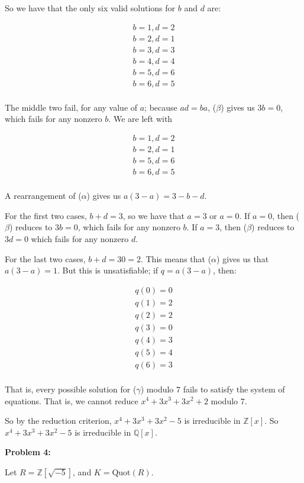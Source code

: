 \documentclass[a4paper,12pt]{article}
\newcommand{\shunt}{\vspace{20mm}}
\newcommand{\al}{\alpha} %
\newcommand{\be}{\beta}
\newcommand{\ga}{\gamma}
\newcommand{\Q}{\mathbb{Q}}
\newcommand{\Z}{\mathbb{Z}}
\begin{document}
So we have that the only six valid solutions for $b$ and $d$ are:

\begin{align*}
b=1,d=2\\
b=2,d=1\\
b=3,d=3\\
b=4,d=4\\
b=5,d=6\\
b=6,d=5\\
\end{align*}

The middle two fail, for any value of $a$; because $ad=ba$, ($\be$) gives us $3b=0$, which fails for any nonzero $b$. We are left with 

\begin{align*}
b=1,d=2\\
b=2,d=1\\
b=5,d=6\\
b=6,d=5\\
\end{align*}

A rearrangement of ($\al$) gives us $a(3-a)=3-b-d$.

For the first two cases, $b+d=3$, so we have that $a=3$ or $a=0$. If $a=0$, then ($\be$) reduces to $3b=0$, which fails for any nonzero $b$. If $a=3$, then ($\be$) reduces to $3d=0$ which fails for any nonzero $d$.

For the last two cases, $b+d=30=2$. This means that ($\al$) gives us that $a(3-a)=1$. But this is unsatisfiable; if $q = a(3-a)$, then:

\begin{align*}
q(0)=0\\
q(1)=2\\
q(2)=2\\
q(3)=0\\
q(4)=3\\
q(5)=4\\
q(6)=3\\
\end{align*}

That is, every possible solution for ($\ga$) modulo $7$ fails to satisfy the system of equations. That is, we cannot reduce $x^4 + 3x^3 + 3x^2 +2$ modulo $7$. 

So by the reduction criterion, $x^4 + 3x^3 + 3x^2 -5$ is irreducible in $\Z[x]$. So $x^4 + 3x^3 + 3x^2 -5$ is irreducible in $\Q[x]$.

\shunt

{\bf Problem 4:} 

Let $R = \Z[\sqrt{-5}]$, and $K = \text{Quot}(R)$. 
\end{document}
